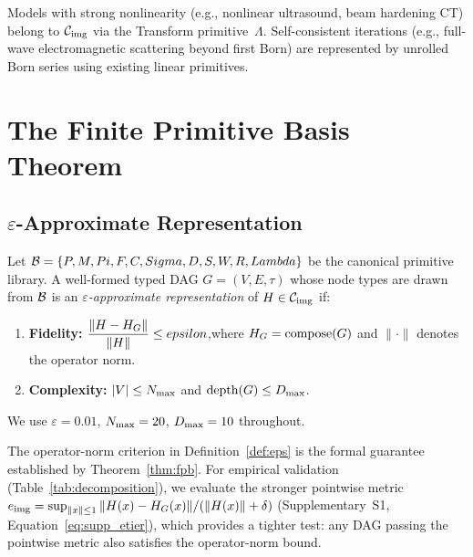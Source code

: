 \documentclass[11pt]{article}
\begin{document}
Models with strong nonlinearity (e.g., nonlinear ultrasound, beam hardening CT) belong to $\mathcal{C}_{\mathrm{img}}$ via the Transform primitive~$\Lambda$. Self-consistent iterations (e.g., full-wave electromagnetic scattering beyond first Born) are represented by unrolled Born series using existing linear primitives.


\section{The Finite Primitive Basis Theorem}
\label{sec:theorem}

\subsection{\texorpdfstring{$\varepsilon$}{epsilon}-Approximate Representation}

\begin{definition}
\label{def:eps}
Let $\mathcal{B} = \{P, M, Pi, F, C, Sigma, D, S, W, R, Lambda\}$ be the canonical primitive library. A well-formed typed DAG $G = (V, E, \tau)$ whose node types are drawn from $\mathcal{B}$ is an \emph{$\varepsilon$-approximate representation} of $H \in \mathcal{C}_{\mathrm{img}}$ if:
\begin{enumerate}
  \item \textbf{Fidelity:} $\displaystyle \frac{\|H - H_{G}\|}{\|H\|} \leq epsilon$,\quad where $H_{G} = \mathrm{compose}(G)$ and $\|\cdot\|$ denotes the operator norm.
  \item \textbf{Complexity:} $|V| \leq N_{\max}$ and $\mathrm{depth}(G) \leq D_{\max}$.
\end{enumerate}
We use $\varepsilon = 0.01$, $N_{\max} = 20$, $D_{\max} = 10$ throughout.
\end{definition}

\begin{remark}
\label{rem:metric}
The operator-norm criterion in Definition~\ref{def:eps} is the formal guarantee established by Theorem~\ref{thm:fpb}. For empirical validation (Table~\ref{tab:decomposition}), we evaluate the stronger pointwise metric $e_{\mathrm{img}} = \sup_{\|x\| \leq 1} \|H(x) - H_{G}(x)\| / (\|H(x)\| + \delta)$ (Supplementary~S1, Equation~\ref{eq:supp_etier}), which provides a tighter test: any DAG passing the pointwise metric also satisfies the operator-norm bound.
\end{remark}
\end{document}
